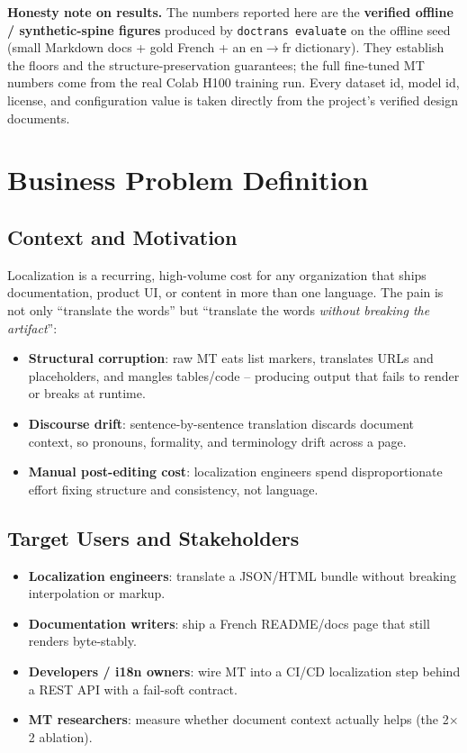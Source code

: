 \documentclass[12pt,a4paper]{article}
\begin{document}
\textbf{Honesty note on results.} The numbers reported here are the \textbf{verified offline / synthetic-spine figures} produced by \texttt{doctrans evaluate} on the offline seed (small Markdown docs + gold French + an en$\rightarrow$fr dictionary). They establish the floors and the structure-preservation guarantees; the full fine-tuned MT numbers come from the real Colab H100 training run. Every dataset id, model id, license, and configuration value is taken directly from the project's verified design documents.

\section{Business Problem Definition}

\subsection{Context and Motivation}

Localization is a recurring, high-volume cost for any organization that ships documentation, product UI, or content in more than one language. The pain is not only ``translate the words'' but ``translate the words \emph{without breaking the artifact}'':
\begin{itemize}
  \item \textbf{Structural corruption}: raw MT eats list markers, translates URLs and placeholders, and mangles tables/code -- producing output that fails to render or breaks at runtime.
  \item \textbf{Discourse drift}: sentence-by-sentence translation discards document context, so pronouns, formality, and terminology drift across a page.
  \item \textbf{Manual post-editing cost}: localization engineers spend disproportionate effort fixing structure and consistency, not language.
\end{itemize}

\subsection{Target Users and Stakeholders}

\begin{itemize}
  \item \textbf{Localization engineers}: translate a JSON/HTML bundle without breaking interpolation or markup.
  \item \textbf{Documentation writers}: ship a French README/docs page that still renders byte-stably.
  \item \textbf{Developers / i18n owners}: wire MT into a CI/CD localization step behind a REST API with a fail-soft contract.
  \item \textbf{MT researchers}: measure whether document context actually helps (the 2$\times$2 ablation).
\end{itemize}
\end{document}
